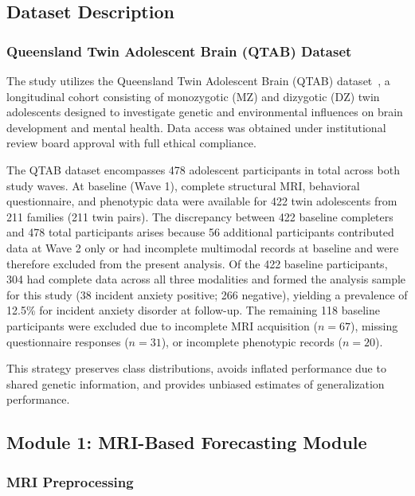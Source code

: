 \documentclass[10pt,letterpaper]{article}
\newcommand{\hlpar}[1]{\leavevmode\colorbox{yellow!30}{\parbox{\dimexpr\linewidth-2\fboxsep\relax}{#1}}\vspace{2pt}}
\begin{document}
        \subsection*{Dataset Description}

        \subsubsection*{\textbf{Queensland Twin Adolescent Brain (QTAB) Dataset}}

        The study utilizes the Queensland Twin Adolescent Brain (QTAB) dataset~\cite{ref31}, a longitudinal cohort consisting of monozygotic (MZ) and dizygotic (DZ) twin adolescents designed to investigate genetic and environmental influences on brain development and mental health. Data access was obtained under institutional review board approval with full ethical compliance.


        \hlpar{The QTAB dataset encompasses 478 adolescent participants in total across both study waves. At baseline (Wave 1), complete structural MRI, behavioral questionnaire, and phenotypic data were available for 422 twin adolescents from 211 families (211 twin pairs). The discrepancy between 422 baseline completers and 478 total participants arises because 56 additional participants contributed data at Wave 2 only or had incomplete multimodal records at baseline and were therefore excluded from the present analysis. Of the 422 baseline participants, 304 had complete data across all three modalities and formed the analysis sample for this study (38 incident anxiety positive; 266 negative), yielding a prevalence of 12.5\% for incident anxiety disorder at follow-up. The remaining 118 baseline participants were excluded due to incomplete MRI acquisition ($n = 67$), missing questionnaire responses ($n = 31$), or incomplete phenotypic records ($n = 20$).}

                                            This strategy preserves class distributions, avoids inflated performance due to shared genetic information, and provides unbiased estimates of generalization performance.

                                            \subsection*{Module 1: MRI-Based Forecasting Module}

                                            \subsubsection*{\textbf{MRI Preprocessing}}
\end{document}
